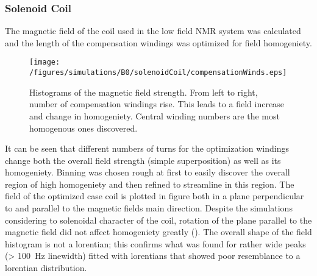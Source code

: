             \subsubsection{Solenoid Coil}
            The magnetic field of the coil used in the low field NMR system was calculated and the length of the compensation windings was optimized for field homogeniety.
                \begin{figure}
                    \centering
                    \texttt{[image: /figures/simulations/B0/solenoidCoil/compensationWinds.eps]}
                    \caption[Compensation wind optimization]{Histograms of the magnetic field strength. From left to right, number of compensation windings rise. This leads to a field increase and change in homogeniety. Central winding numbers are the most homogenous ones discovered.}
                \label{fig:results:compensationWindOptimization}
            \end{figure}
            It can be seen that different numbers of turns for the optimization windings change both the overall field strength (simple superposition) as well as its homogeniety. Binning was chosen rough at first to easily discover the overall region of high homogeniety and then refined to streamline in this region.
            The field of the optimized case coil is plotted in figure  both in a plane perpendicular to and parallel to the magnetic fields main direction. Despite the simulations considering to solenoidal character of the coil, rotation of the plane parallel to the magnetic field did not affect homogeniety greatly (). The overall shape of the field histogram is not a lorentian; this confirms what was found for rather wide peaks (> \SI{100}{\hertz} linewidth) fitted with lorentians that showed poor resemblance to a lorentian distribution.
